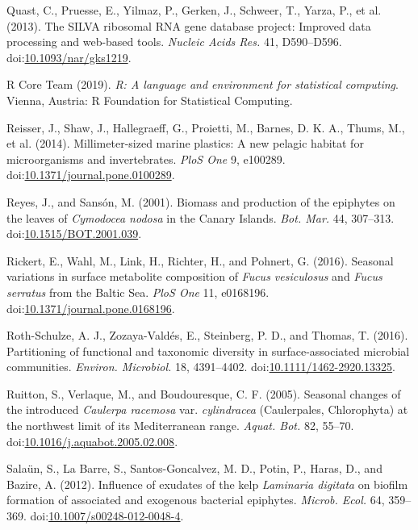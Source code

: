 \documentclass[
  12pt,
]{article}
\begin{document}
\leavevmode\hypertarget{ref-Quast2013}{}%
Quast, C., Pruesse, E., Yilmaz, P., Gerken, J., Schweer, T., Yarza, P.,
et al. (2013). The SILVA ribosomal RNA gene database project: Improved
data processing and web-based tools. \emph{Nucleic Acids Res.} 41,
D590--D596.
doi:\href{https://doi.org/10.1093/nar/gks1219}{10.1093/nar/gks1219}.

\leavevmode\hypertarget{ref-RCoreTeam2019}{}%
R Core Team (2019). \emph{R: A language and environment for statistical
computing}. Vienna, Austria: R Foundation for Statistical Computing.

\leavevmode\hypertarget{ref-Reisser2014}{}%
Reisser, J., Shaw, J., Hallegraeff, G., Proietti, M., Barnes, D. K. A.,
Thums, M., et al. (2014). Millimeter-sized marine plastics: A new
pelagic habitat for microorganisms and invertebrates. \emph{PloS One} 9,
e100289.
doi:\href{https://doi.org/10.1371/journal.pone.0100289}{10.1371/journal.pone.0100289}.

\leavevmode\hypertarget{ref-Reyes2001}{}%
Reyes, J., and Sansón, M. (2001). Biomass and production of the
epiphytes on the leaves of \emph{Cymodocea nodosa} in the Canary
Islands. \emph{Bot. Mar.} 44, 307--313.
doi:\href{https://doi.org/10.1515/BOT.2001.039}{10.1515/BOT.2001.039}.

\leavevmode\hypertarget{ref-Rickert2016}{}%
Rickert, E., Wahl, M., Link, H., Richter, H., and Pohnert, G. (2016).
Seasonal variations in surface metabolite composition of \emph{Fucus
vesiculosus} and \emph{Fucus serratus} from the Baltic Sea. \emph{PloS
One} 11, e0168196.
doi:\href{https://doi.org/10.1371/journal.pone.0168196}{10.1371/journal.pone.0168196}.

\leavevmode\hypertarget{ref-Roth-Schulze2016}{}%
Roth-Schulze, A. J., Zozaya-Valdés, E., Steinberg, P. D., and Thomas, T.
(2016). Partitioning of functional and taxonomic diversity in
surface-associated microbial communities. \emph{Environ. Microbiol.} 18,
4391--4402.
doi:\href{https://doi.org/10.1111/1462-2920.13325}{10.1111/1462-2920.13325}.

\leavevmode\hypertarget{ref-Ruitton2005}{}%
Ruitton, S., Verlaque, M., and Boudouresque, C. F. (2005). Seasonal
changes of the introduced \emph{Caulerpa racemosa} var.
\emph{cylindracea} (Caulerpales, Chlorophyta) at the northwest limit of
its Mediterranean range. \emph{Aquat. Bot.} 82, 55--70.
doi:\href{https://doi.org/10.1016/j.aquabot.2005.02.008}{10.1016/j.aquabot.2005.02.008}.

\leavevmode\hypertarget{ref-Salaun2012}{}%
Salaün, S., La Barre, S., Santos-Goncalvez, M. D., Potin, P., Haras, D.,
and Bazire, A. (2012). Influence of exudates of the kelp \emph{Laminaria
digitata} on biofilm formation of associated and exogenous bacterial
epiphytes. \emph{Microb. Ecol.} 64, 359--369.
doi:\href{https://doi.org/10.1007/s00248-012-0048-4}{10.1007/s00248-012-0048-4}.
\end{document}

